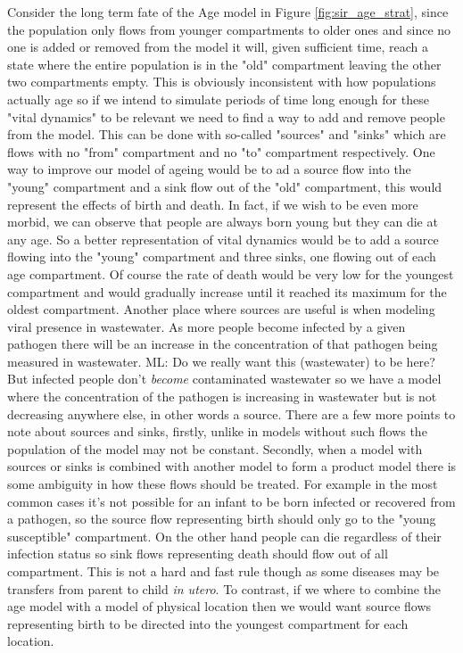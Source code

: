 \documentclass[pdflatex,sn-basic]{sn-jnl}%
\theoremstyle{definition}
\newcommand{\mli}[1]{{\color{purple} ML: #1}}
\begin{document}
Consider the long term fate of the Age model in Figure \ref{fig:sir_age_strat}, since the population only flows from younger compartments to older ones and since no one is added or removed from the model it will, given sufficient time, reach a state where the entire population is in the "old" compartment leaving the other two compartments empty. This is obviously inconsistent with how populations actually age so if we intend to simulate periods of time long enough for these "vital dynamics" to be relevant we need to find a way to add and remove people from the model. This can be done with so-called "sources" and "sinks" which are flows with no "from" compartment and no "to" compartment respectively. One way to improve our model of ageing would be to ad a source flow into the "young" compartment and a sink flow out of the "old" compartment, this would represent the effects of birth and death. In fact, if we wish to be even more morbid, we can observe that people are always born young but they can die at any age. So a better representation of vital dynamics would be to add a source flowing into the "young" compartment and three sinks, one flowing out of each age compartment. Of course the rate of death would be very low for the youngest compartment and would gradually increase until it reached its maximum for the oldest compartment. Another place where sources are useful is when modeling viral presence in wastewater. As more people become infected by a given pathogen there will be an increase in the concentration of that pathogen being measured in wastewater. \mli{Do we really want this (wastewater) to be here?} But infected people don't \emph{become} contaminated wastewater so we have a model where the concentration of the pathogen is increasing in wastewater but is not decreasing anywhere else, in other words a source. There are a few more points to note about sources and sinks, firstly, unlike in models without such flows the population of the model may not be constant. Secondly, when a model with sources or sinks is combined with another model to form a product model there is some ambiguity in how these flows should be treated. For example in the most common cases it's not possible for an infant to be born infected or recovered from a pathogen, so the source flow representing birth should only go to the "young susceptible" compartment. On the other hand people can die regardless of their infection status so sink flows representing death should flow out of all compartment. This is not a hard and fast rule though as some diseases may be transfers from parent to child \emph{in utero}. To contrast, if we where to combine the age model with a model of physical location then we would want source flows representing birth to be directed into the youngest compartment for each location.
\end{document}
